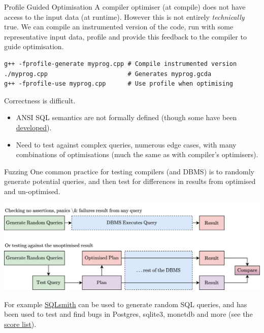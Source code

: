 \begin{sidenotebox}{Profile Guided Optimisation}
    A compiler optimiser (at compile) does not have access to the input data (at runtime). However this is not entirely \textit{technically} true. We can compile an instrumented version of the code, run with some representative input data, profile and provide this feedback to the compiler to guide optimisation.
    \begin{verbatim}
g++ -fprofile-generate myprog.cpp # Compile instrumented version
./myprog.cpp                      # Generates myprog.gcda
g++ -fprofile-use myprog.cpp      # Use profile when optimising
    \end{verbatim}
\end{sidenotebox} 

Correctness is difficult.
\begin{itemize}
    \item ANSI SQL semantics are not formally defined (though some have been \href{https://dl.acm.org/doi/10.1145/111197.111212}{developed}).
    \item Need to test against complex queries, numerous edge cases, with many combinations of optimisations (much the same as with compiler's optimisers).
\end{itemize}

\begin{sidenotebox}{Fuzzing}
    One common practice for testing compilers (and DBMS) is to randomly generate potential queries, and then test for differences in results from optimised and un-optimised.
    \begin{center}
        \includegraphics[width=.8\textwidth]{optimisation/images/fuzzing.drawio.png}
    \end{center}
    For example \href{https://github.com/anse1/sqlsmith}{SQLsmith} can be used to generate random SQL queries, and has been used to test and find bugs in Postgres, sqlite3, monetdb and more (see the \href{https://github.com/anse1/sqlsmith/wiki#score-list}{score list}).
\end{sidenotebox}

